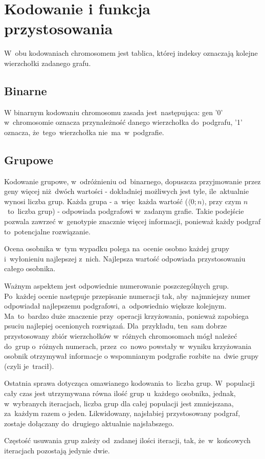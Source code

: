 \documentclass[11pt]{aghdpl}
\begin{document}
\chapter{Kodowanie i funkcja przystosowania}
\label{cha:encoding}
W~obu kodowaniach chromosomem jest tablica, której indeksy oznaczają kolejne wierzchołki zadanego grafu.
\section{Binarne}
\label{sec:binary}
W binarnym kodowaniu chromosomu zasada jest~następująca: gen '0' w~chromosomie oznacza przynależność danego wierzchołka 
do~podgrafu, '1' oznacza, że~tego~wierzchołka nie~ma~w~podgrafie.
\section{Grupowe}
\label{sec:group}
Kodowanie grupowe, w~odróżnieniu od~binarnego, dopuszcza przyjmowanie przez geny więcej niż~dwóch wartości - dokładniej możliwych 
jest tyle, ile~aktualnie wynosi liczba grup. Każda grupa - a~więc~każda wartość ($\langle0; n)$, przy czym $n$~to~liczba grup) - odpowiada 
podgrafowi w~zadanym grafie. Takie podejście pozwala zawrzeć w~genotypie znacznie więcej informacji, ponieważ każdy podgraf to~potencjalne 
rozwiązanie. 

Ocena osobnika w~tym wypadku polega na~ocenie osobno każdej grupy i~wyłonieniu najlepszej z~nich. Najlepsza wartość odpowiada przystosowaniu 
całego osobnika.

Ważnym aspektem jest odpowiednie numerowanie poszczególnych grup. Po~każdej ocenie następuje przepisanie numeracji tak, aby~najmniejszy
numer odpowiadał najlepszemu podgrafowi, a~odpowiednio większe kolejnym. Ma~to~bardzo duże znaczenie przy~operacji krzyżowania, ponieważ 
zapobiega psuciu najlepiej ocenionych rozwiązań. Dla~przykładu, ten~sam dobrze przystosowany zbiór wierzchołków w~różnych chromosomach mógł
należeć do~grup o~różnych numerach, przez~co~nowo powstały w~wyniku krzyżowania osobnik otrzymywał informacje o wspomnianym podgrafie rozbite
na~dwie grupy (czyli je~tracił).

Ostatnia sprawa dotycząca omawianego kodowania to~liczba grup. W~populacji cały czas jest utrzymywana równa ilość grup u~każdego osobnika, jednak,
w~wybranych iteracjach, liczba grup dla całej populacji jest zmniejszana, za~każdym razem o jeden. Likwidowany, najsłabiej przystosowany podgraf, 
zostaje dołączany do~drugiego aktualnie najsłabszego.

Częstość usuwania grup zależy od~zadanej ilości iteracji, tak, że~w~końcowych iteracjach pozostają jedynie dwie.
\end{document}
